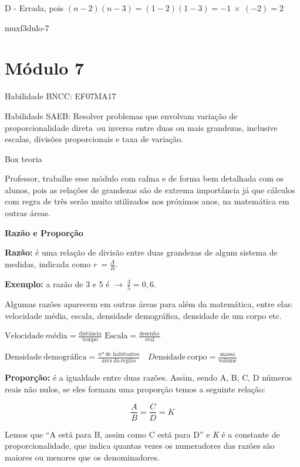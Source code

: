 {D - Errada, pois
\(\left( n - 2 \right)\left( n - 3 \right) = \left( 1 - 2 \right)\left( 1 - 3 \right) = - 1\  \times \ ( - 2) = 2\)

muxf3dulo-7}{%
\section{Módulo 7}

Habilidade BNCC: EF07MA17

Habilidade SAEB: Resolver problemas que envolvam variação de
proporcionalidade direta~ou inversa entre duas ou mais grandezas,
inclusive escalas, divisões proporcionais e taxa de variação.

Box teoria

Professor, trabalhe esse módulo com calma e de forma bem detalhada com
os alunos, pois as relações de grandezas são de extrema importância já
que cálculos com regra de três serão muito utilizados nos próximos anos,
na matemática em outras áreas.

\textbf{Razão e Proporção}

\textbf{{Razão:}} é uma relação de divisão entre duas grandezas de algum
sistema de medidas, indicada como \(r\  = \frac{A}{B}\).

\textbf{Exemplo:} a razão de 3 e 5 é
\(\rightarrow \ \frac{3}{5} = 0,6.\)

Algumas razões aparecem em outras áreas para além da matemática, entre
elas: velocidade média, escala, densidade demográfica, densidade de um
corpo etc.

\(\text{Vel}\text{ocidade}\ mé\text{dia} = \frac{\text{dist}â\text{ncia}}{\text{tempo}}\)
\(\text{Escala} = \frac{\text{desen}ho\ }{\text{real}}\ \)

\(\text{Densidade}\ \text{demogr}á\text{fica} = \frac{nº\ \text{de}\text{\ h}\text{abitantes}}{á\text{rea}\ \text{da}\ \text{regi}ão}\)
\(\text{\ \ \ \ \ \ \ \ \ \ \ \ \ \ \ \ \ \ \ \ \ \ \ \ \ }D\text{ensidade}\ \text{corpo} = \frac{\text{massa}}{\text{volume}}\)

\textbf{{Proporção:}} é a igualdade entre duas razões. Assim, sendo A,
B, C, D números reais não nulos, se eles formam uma proporção temos a
seguinte relação:

\[\frac{A}{B} = \frac{C}{D} = K\]

Lemos que ``A está para B, assim como C está para D'' e \emph{K} é a
constante de proporcionalidade, que indica quantas vezes os numeradores
das razões são maiores ou menores que os denominadores.

}
